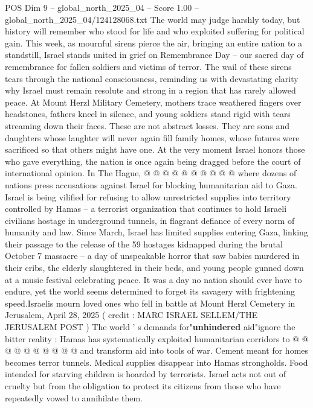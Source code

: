 \begin{textsample}{POS Dim 9 – global\_north\_2025\_04 – Score 1.00 – global\_north\_2025\_04/124128068.txt}  \label{ex:f9_pos_423}
The world may judge harshly today, but history will remember who stood for life and who exploited suffering for political gain.
This week, as mournful sirens pierce the air, bringing an entire nation to a standstill, Israel stands united in grief on Remembrance Day -- our sacred day of remembrance for fallen soldiers and victims of terror.
The wail of these sirens tears through the national consciousness, reminding us with devastating clarity why Israel must remain resolute and strong in a region that has rarely allowed peace.
At Mount Herzl Military Cemetery, mothers trace weathered fingers over headstones, fathers kneel in silence, and young soldiers stand rigid with tears streaming down their faces.
These are not abstract losses.
They are sons and daughters whose laughter will never again fill family homes, whose futures were sacrificed so that others might have one.
At the very moment Israel honors those who gave everything, the nation is once again being dragged before the court of international opinion.
In The Hague, @ @ @ @ @ @ @ @ @ @ where dozens of nations press accusations against Israel for blocking humanitarian aid to Gaza.
Israel is being vilified for refusing to allow unrestricted supplies into territory controlled by Hamas -- a terrorist organization that continues to hold Israeli civilians hostage in underground tunnels, in flagrant defiance of every norm of humanity and law.
Since March, Israel has limited supplies entering Gaza, linking their passage to the release of the 59 hostages kidnapped during the brutal October 7 massacre -- a day of unspeakable horror that saw babies murdered in their cribs, the elderly slaughtered in their beds, and young people gunned down at a music festival celebrating peace.
It was a day no nation should ever have to endure, yet the world seems determined to forget its savagery with frightening speed.Israelis mourn loved ones who fell in battle at Mount Herzl Cemetery in Jerusalem, April 28, 2025 ( credit : MARC ISRAEL SELLEM/THE JERUSALEM POST ) The world ' s demands for"\textbf{unhindered} aid"ignore the bitter reality : Hamas has systematically exploited humanitarian corridors to @ @ @ @ @ @ @ @ @ @ and transform aid into tools of war.
Cement meant for homes becomes terror tunnels.
Medical supplies disappear into Hamas strongholds.
Food intended for starving children is hoarded by terrorists.
Israel acts not out of cruelty but from the obligation to protect its citizens from those who have repeatedly vowed to annihilate them.

\end{textsample}
